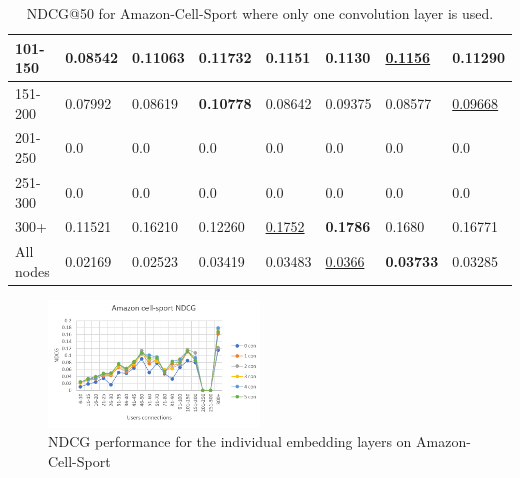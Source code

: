 \begin{table}[]
\begin{tabular}{|l|l|l|l|l|l|l||l|}
        101-150     & 0.08542                        & 0.11063                        & \textbf{0.11732}               & 0.1151                         & 0.1130                         & \underline{0.1156}              & 0.11290                    \\ \hline
        151-200     & 0.07992                        & 0.08619                        & \textbf{0.10778}               & 0.08642                        & 0.09375                        & 0.08577                         & \underline{0.09668}        \\ \hline
        201-250     & 0.0                            & 0.0                            & 0.0                            & 0.0                            & 0.0                            & 0.0                             & 0.0                        \\ \hline
        251-300     & 0.0                            & 0.0                            & 0.0                            & 0.0                            & 0.0                            & 0.0                             & 0.0                        \\ \hline
        300+        & 0.11521                        & 0.16210                        & 0.12260                        & \underline{0.1752}             & \textbf{0.1786}                & 0.1680                          & 0.16771                    \\ \hline
        All nodes     & 0.02169                        & 0.02523                        & 0.03419                        & 0.03483                        & \underline{0.0366}             & \textbf{0.03733}                & 0.03285                    \\ \hline
    \end{tabular}
    \caption{NDCG@50 for Amazon-Cell-Sport where only one convolution layer is used.}
    \label{tab:Amazon-Cell-Sport-ndcg-evaluation}
\end{table}
\begin{figure}[]
    \includegraphics[width=0.5\textwidth]{figures/evaluation/amazon-cell-sport-ndcg.png}
    \centering
    \caption{NDCG performance for the individual embedding layers on Amazon-Cell-Sport}
    \label{fig:amazon-cell-sport-individual-evaluation-ndcg}
\end{figure}